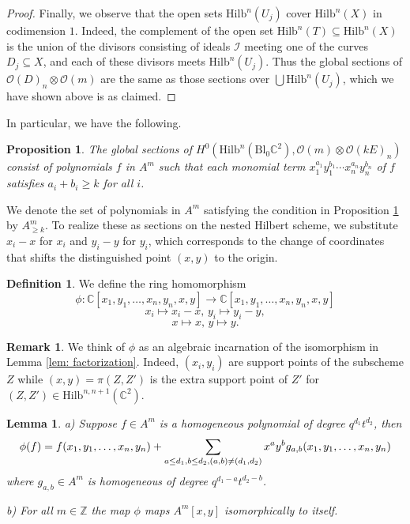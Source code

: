 \documentclass[12pt]{amsart}
\newcommand{\Hilb}{\mathrm{Hilb}}
\newcommand{\C}{\mathbb{C}}
\newcommand{\Z}{\mathbb{Z}}
\newcommand{\CO}{\mathcal{O}}
\numberwithin{equation}{section}
\newtheorem{proposition}[theorem]{Proposition}
\newtheorem{lemma}[theorem]{Lemma}
\theoremstyle{definition}
\newtheorem{remark}[theorem]{Remark}
\newtheorem{definition}[theorem]{Definition}
\begin{document}
\begin{proof}
    Finally, we observe that the open sets $\Hilb^n(U_j)$ cover $\Hilb^n(X)$ in codimension $1$. Indeed, the complement of the open set $\Hilb^n(T)\subseteq \Hilb^n(X)$ is the union of the divisors consisting of ideals $\mathcal{I}$ meeting one of the curves $D_j\subseteq X$, and each of these divisors meets $\Hilb^n(U_j)$. Thus the global sections of $\mathcal{O}(D)_n\otimes \mathcal{O}(m)$ are the same as those sections over $\bigcup \Hilb^n(U_j)$, which we have shown above is as claimed.
\end{proof}

In particular, we have the following.

\begin{proposition}
\label{prop: sections blowup}
    The global sections of $H^0\left(\Hilb^n (\mathrm{Bl}_0 \C^2),\CO(m)\otimes \CO(kE)_n\right)$ consist of polynomials $f$ in $A^{m}$ such that each monomial term $x_1^{a_1}y_1^{b_1} \cdots x_n^{a_n}y_n^{b_n}$ of $f$ satisfies $a_i+b_i \geq k$ for all $i$. 
\end{proposition}

We denote the set of polynomials in $A^{m}$ satisfying the  condition in Proposition \ref{prop: sections blowup} by $A^{m}_{\geq k}$.
To realize these as sections on the nested Hilbert scheme, we substitute 
$x_i-x$ for $x_i$ and $y_i-y$ for $y_i$,
which corresponds to the change of coordinates that shifts the distinguished point $(x,y)$ to the origin.


\begin{definition}
We define the ring homomorphism
$$\phi: \C[x_1, y_1, \dots, x_n, y_n, x, y] \rightarrow \C[x_1, y_1, \dots, x_n, y_n, x, y]$$
    $$x_i \mapsto x_i-x, \, y_i \mapsto y_i-y,$$
    $$x \mapsto x, \, y \mapsto y.$$
\end{definition}

\begin{remark}
We think of $\phi$ as an algebraic incarnation of the isomorphism in Lemma \ref{lem: factorization}.  Indeed, $(x_i,y_i)$ are support points of the subscheme $Z$ while $(x,y)=\pi(Z,Z')$ is the extra support point of $Z'$ for  $(Z,Z')\in \Hilb^{n,n+1}(\C^2)$.  
\end{remark}

\begin{lemma}
\label{lem: A[x,y] span}
a) Suppose $f\in A^m$ is a homogeneous polynomial of degree $q^{d_1}t^{d_2}$, then
\begin{equation}
\label{eq: shifted f}
\phi(f)=\\
f(x_1,y_1,\ldots,x_n,y_n)+\sum_{a\le d_1,b\le d_2,(a,b)\neq (d_1,d_2)} x^ay^b g_{a,b}(x_1,y_1,\ldots,x_n,y_n)
\end{equation}
where $g_{a,b}\in A^m$ is homogeneous of degree $q^{d_1-a}t^{d_2-b}$.

b) For all $m\in \Z$ the map $\phi$ maps $A^m[x,y]$ isomorphically to itself.
\end{lemma}
\end{document}
